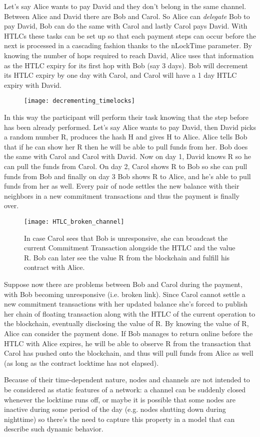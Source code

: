 		Let's say Alice wants to pay David and they don't belong in the same channel. Between Alice and David there are Bob and Carol. So Alice can \textit{delegate} Bob to pay David, Bob can do the same with Carol and lastly Carol pays David. With HTLCs these tasks can be set up so that each payment steps can occur before the next is processed in a cascading fashion thanks to the nLockTime parameter. By knowing the number of hops required to reach David, Alice uses that information as the HTLC expiry for its first hop with Bob (say 3 days). Bob will decrement its HTLC expiry by one day with Carol, and Carol will have a 1 day HTLC expiry with David. 
		
		\begin{figure}[h]
			\centering
			\texttt{[image: decrementing\_timelocks]}
		\end{figure}
	
		In this way the participant will perform their task knowing that the step before has been already performed. Let's say Alice wants to pay David, then David picks a random number R, produces the hash H and gives H to Alice. Alice tells Bob that if he can show her R then he will be able to pull funds from her. Bob does the same with Carol and Carol with David. Now on day 1, David knows R so he can pull the funds from Carol. On day 2, Carol shows R to Bob so she can pull funds from Bob and finally on day 3 Bob shows R to Alice, and he's able to pull funds from her as well. Every pair of node settles the new balance with their neighbors in a new commitment transactions and thus the payment is finally over.
		
		\begin{figure}[htbp]
			\centering
			\texttt{[image: HTLC\_broken\_channel]}
			\caption{In case Carol sees that Bob is unresponsive, she can broadcast the current Commitment Transaction alongside the HTLC and the value R. Bob can later see the value R from the blockchain and fulfill his contract with Alice.}
		\end{figure}
		
		Suppose now there are problems between Bob and Carol during the payment, with Bob becoming unresponsive (i.e. broken link). Since Carol cannot settle a new commitment transactions with her updated balance she's forced to publish her chain of floating transaction along with the HTLC of the current operation to the blockchain, eventually disclosing the value of R. By knowing the value of R, Alice can consider the payment done. If Bob manages to return online before the HTLC with Alice expires, he will be able to observe R from the transaction that Carol has pushed onto the blockchain, and thus will pull funds from Alice as well (as long as the contract locktime has not elapsed).
		
		Because of their time-dependent nature, nodes and channels are not intended to be considered as static features of a network: a channel can be suddenly closed whenever the locktime runs off, or maybe it is possible that some nodes are inactive during some period of the day (e.g. nodes shutting down during nighttime) so there's the need to capture this property in a model that can describe such dynamic behavior.
		
	
